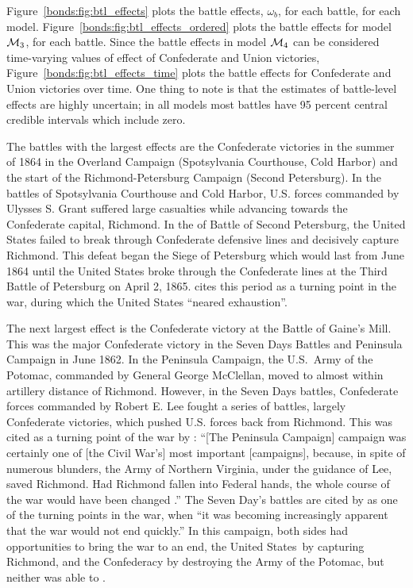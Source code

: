 Figure~\ref{bonds:fig:btl_effects} plots the battle effects, $\omega_{b}$, for each battle, for each model.
Figure~\ref{bonds:fig:btl_effects_ordered} plots the battle effects for model $\mathcal{M}_{\text{3}}$, for each battle.
Since the battle effects in model $\mathcal{M}_{\text{4}}$ can be considered time-varying values of effect of Confederate and Union victories, Figure~\ref{bonds:fig:btl_effects_time} plots the battle effects for Confederate and Union victories over time. 
One thing to note is that the estimates of battle-level effects are highly uncertain; in all models most battles have 95 percent central credible intervals which include zero.

The battles with the largest effects are the Confederate victories in the summer of 1864 in the Overland Campaign (Spotsylvania Courthouse, Cold Harbor) and the start of the Richmond-Petersburg Campaign (Second Petersburg).
In the battles of Spotsylvania Courthouse and Cold Harbor, U.S. forces commanded by Ulysses S. Grant suffered large casualties while advancing towards the Confederate capital, Richmond.
In the of Battle of Second Petersburg, the United States failed to break through Confederate defensive lines and decisively capture Richmond.
This defeat began the Siege of Petersburg which would last from June 1864 until the United States broke through the Confederate lines at the Third Battle of Petersburg on April 2, 1865.
\textcite[151-152]{Reiter2009} cites this period as a turning point in the war, during which the United States ``neared exhaustion''.

The next largest effect is the Confederate victory at the Battle of Gaine's Mill.
This was the major Confederate victory in the Seven Days Battles and Peninsula Campaign in June 1862.
In the Peninsula Campaign, the U.S.\ Army of the Potomac, commanded by General George McClellan, moved to almost within artillery distance of Richmond.
However, in the Seven Days battles, Confederate forces commanded by Robert E. Lee fought a series of battles, largely Confederate victories, which pushed U.S. forces back from Richmond.
This was cited as a turning point of the war by \textcite{Fuller1942a}: ``[The Peninsula Campaign] campaign was certainly one of [the Civil War's] most important [campaigns], because, in spite of numerous blunders, the Army of Northern Virginia, under the guidance of Lee, saved Richmond. Had Richmond fallen into Federal hands, the whole course of the war would have been changed \parencite[206]{Fuller1942a}.''
The Seven Day's battles are cited by \textcite[145]{Reiter2009} as one of the turning points in the war, when ``it was becoming increasingly apparent that the war would not end quickly.''
In this campaign, both sides had opportunities to bring the war to an end, the United States\ by capturing Richmond, and the Confederacy by destroying the Army of the Potomac, but neither was able to \parencite[Chapter6]{Fuller1942a}. 

